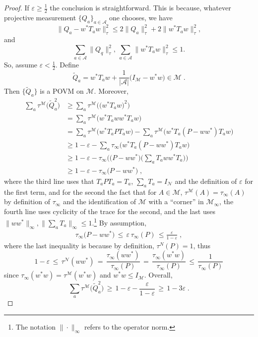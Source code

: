 \documentclass[11pt]{article}
\theoremstyle{definition}
\newcommand{\Id}{\ensuremath{I}}
\newcommand{\mA}{\ensuremath{\mathcal{A}}}
\newcommand{\mM}{\ensuremath{\mathcal{M}}}
\newcommand{\eps}{\varepsilon}
\newcommand{\mN}{\mathcal{N}}
\begin{document}
\begin{proof}
If $\eps\geq \frac{1}{2}$ the conclusion is straightforward. This is because, whatever projective measurement $\{Q_a\}_{a\in \mA}$ one chooses, we have
\[
\|Q_a-w^*T_aw\|_\tau^2\leq 2\|Q_a\|_\tau^2+2\|w^*T_aw\|_\tau^2,
\] 
and 
\[
\sum_{a\in \mA} \|Q_q\|_\tau^2,\ \sum_{a\in \mA} \|w^*T_aw\|_\tau^2\leq 1.
\]
So, assume $\eps<\frac{1}{2}$. 
Define 
\[\tilde{Q}_a = w^* T_a w  + \frac{1}{|\mA|}\big(\Id_\mM - w^* w\big) \in \mM\;.\]
Then $\{\tilde{Q}_a\}$ is a POVM on $\mM$. Moreover, 
\begin{align*}
\sum_a \tau^\mM \big( \tilde{Q}_a^2 \big) &\geq \sum_a \tau^\mM \big( \big(w^* T_a w \big)^2 \big) \\
&= \sum_a \tau^\mM \big(  w^* T_a w w^*T_a w \big)\\
&= \sum_a \tau^\mM \big(  w^* T_a  P T_a w \big) - \sum_a \tau^\mM \big( w^* T_a  ( P - w w^*) T_a w \big)\\
&\geq 1 - \eps -  \sum_a \tau_\infty \big( w^* T_a  ( P - w w^*) T_a w \big)\\
&\geq 1 - \eps -  \tau_\infty\Big(\big( P - w w^*\big)\Big(\sum_a  T_a w w^* T_a\Big)\Big)\\ 
&\geq 1- \eps- \tau_\infty\big( P- w w^*\big)\;,
\end{align*}
where the third line uses that $T_aPT_a=T_a$, $\sum_a T_a = \Id_\mN$ and the definition of $\eps$ for the first term, and for the second the fact that for $A\in\mM$, $\tau^\mM(A)=\tau_\infty(A)$ by definition of $\tau_\infty$ and the identification of $\mM$ with a ``corner'' in $\mM_\infty$, the fourth line uses cyclicity of the trace for the second, and the last uses $\|ww^*\|_\infty,\|\sum_a T_a\|_\infty\leq 1$.\footnote{The notation $\|\cdot\|_\infty$ refers to the operator norm.} By assumption, 
\begin{align}
\tau_\infty\big( P- w w^*\big) \,\leq\, \eps\, \tau_\infty(P)\,\leq \frac{\eps}{1-\eps}\;,\label{eq:bound_on_P-ww*_in_trace_infty}
\end{align}
where the last inequality is because by definition, $\tau^N(P)=1$, thus
\[1-\eps \,\leq\, \tau^\mN(ww^*) \,=\, \frac{\tau_\infty(ww^*)}{\tau_\infty(P)}\,=\, \frac{\tau_\infty(w^*w)}{\tau_\infty(P)}  \,\leq\, \frac{1}{\tau_\infty(P)}\]
since $\tau_\infty(w^* w) = \tau^\mM(w^* w)$ and $w^*w\leq I_\mM$. Overall, 
\begin{equation}\label{eq:square_greater_1-3eps}
    \sum_a \tau^\mM \big( \tilde{Q}_a^2 \big) \,\geq\, 1-\eps-\frac{\eps}{1-\eps}\,\geq\, 1-3\eps\;.
\end{equation}

\end{proof}
\end{document}
